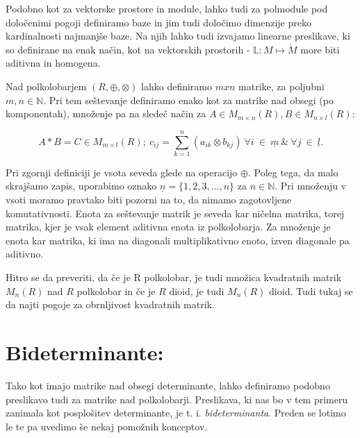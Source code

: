 \documentclass[mat1]{fmfdelo}
\newcommand{\N}{\mathbb N}
\newcommand{\pojem}[1]{\emph{#1}}
\begin{document}
Podobno kot za vektorske prostore in module, lahko tudi za polmodule pod določenimi pogoji definiramo baze in jim tudi določimo dimenzije preko kardinalnosti najmanjše baze. Na njih lahko tudi izvajamo linearne preslikave, ki so definirane na enak način, kot na vektorskih prostorih - $\mathbb{L}: M \mapsto \grave{M}$ more biti aditivna in homogena.

Nad polkolobarjem $(R, \oplus, \otimes)$ lahko definiramo $mxn$ matrike, za poljubni $m,n\in\N$. Pri tem seštevanje definiramo enako kot za matrike nad obsegi (po komponentah), množenje pa na sledeč način za $A\in M_{m\times n}(R), B\in M_{n\times l}(R)$:

$$ 
	A*B = C \in M_{m\times l}(R);~ c_{ij} = \sum_{k = 1}^{n}(a_{ik}\otimes b_{kj})~\forall i~\in~\underline{m}~\&~\forall j~\in~\underline{l}.
$$
\begin{opomba}
	Pri zgornji definiciji je vsota seveda glede na operacijo $\oplus$. Poleg tega, da malo skrajšamo zapis, uporabimo oznako $\underline{n} = \{1, 2, 3, \ldots, n\}$ za $n\in\N$. Pri množenju v vsoti moramo pravtako biti pozorni na to, da nimamo zagotovljene komutativnosti. Enota za seštevanje matrik je seveda kar ničelna matrika, torej matrika, kjer je vsak element aditivna enota iz polkolobarja. Za množenje je enota kar matrika, ki ima na diagonali multiplikativno enoto, izven diagonale pa aditivno.
\end{opomba}

Hitro se da preveriti, da če je R polkolobar, je tudi množica kvadratnih matrik $M_n(R)$ nad $R$ polkolobar in če je $R$ dioid, je tudi $M_n(R)$ dioid. Tudi tukaj se da najti pogoje za obrnljivost kvadratnih matrik. 

\section{Bideterminante:}

Tako kot imajo matrike nad obsegi determinante, lahko definiramo podobno preslikavo tudi za matrike nad polkolobarji. Preslikava, ki nas bo v tem primeru zanimala kot posplošitev determinante, je t. i. \pojem{bideterminanta}. Preden se lotimo le te pa uvedimo še nekaj pomožnih konceptov.
\end{document}
